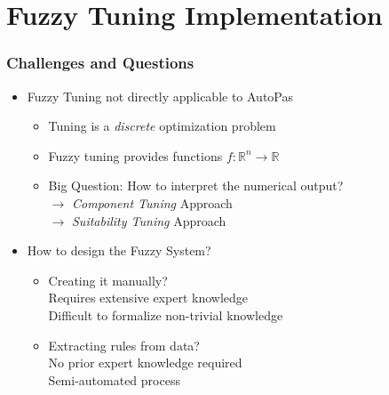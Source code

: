 \documentclass[
	10pt,
	t		%
]{beamer}
\newcommand{\xmark}{\ding{55}}%
\newcommand{\cmark}{\ding{51}}%
\begin{document}
\section{Fuzzy Tuning Implementation}
\begin{frame}
	\frametitle{Challenges and Questions}

	\begin{itemize}
		\item Fuzzy Tuning not directly applicable to AutoPas
		      \begin{itemize}
			      \item Tuning is a \textit{discrete} optimization problem\\
			      \item Fuzzy tuning provides functions $f :\mathbb{R}^n \rightarrow \mathbb{R}$
			      \item Big Question: How to interpret the numerical output?\\
			            \quad $\rightarrow$ \textit{Component Tuning} Approach \\
			            \quad $\rightarrow$ \textit{Suitability Tuning} Approach
		      \end{itemize}
		\item How to design the Fuzzy System?
		      \begin{itemize}
			      \item Creating it manually?\\
			            \quad \xmark \; Requires extensive expert knowledge\\
			            \quad \xmark \; Difficult to formalize non-trivial knowledge
			      \item Extracting rules from data?\\
			            \quad \cmark \; No prior expert knowledge required\\
			            \quad \cmark \; Semi-automated process
		      \end{itemize}
	\end{itemize}
\end{frame}
\end{document}
